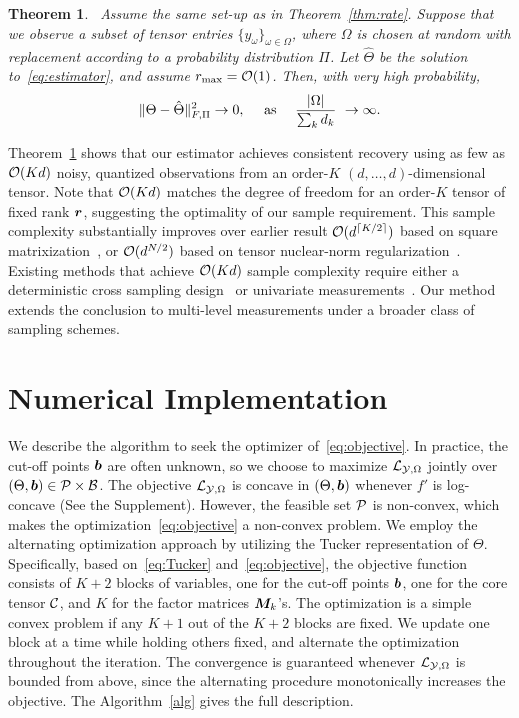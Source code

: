 \documentclass{article}
\theoremstyle{plain}
\newtheorem{thm}{Theorem}[section]
\theoremstyle{definition}
\begin{document}
\begin{thm}~\label{thm:completion}
Assume the same set-up as in Theorem~\ref{thm:rate}. Suppose that we observe a subset of tensor entries $\{y_\omega\}_{\omega\in\Omega}$, where $\Omega$ is chosen at random with replacement according to a probability distribution $\Pi$. Let $\hat \Theta$ be the solution to~\eqref{eq:estimator}, and assume $r_{\max}=\mathcal{O}(1)$. Then, with very high probability, 
\[
\lVert\Theta-\hat \Theta\rVert_{F,\Pi}^2 \to 0,\quad \text{ as }\quad {|\Omega|\over \sum_k d_k} \ \to \infty. 
\]
\end{thm}
Theorem~\ref{thm:completion} shows that our estimator achieves consistent recovery using as few as $\mathcal{O}(Kd)$ noisy, quantized observations from an order-$K$ $(d,\ldots,d)$-dimensional tensor. Note that $\mathcal{O}(Kd)$ matches the degree of freedom for an order-$K$ tensor of fixed rank $\bm{r}$, suggesting the optimality of our sample requirement. This sample complexity substantially improves over earlier result $\mathcal{O}(d^{\lceil K/2\rceil})$ based on square matrixization~\cite{mu2014square}, or $\mathcal{O}(d^{N/2})$ based on tensor nuclear-norm regularization~\cite{yuan2016tensor}. Existing methods that achieve $\mathcal{O}(Kd)$ sample complexity require either a deterministic cross sampling design~\cite{zhang2019cross} or univariate measurements~\cite{ghadermarzy2018learning}. Our method extends the conclusion to multi-level measurements under a broader class of sampling schemes. 

\section{Numerical Implementation}\label{sec:algorithm}
We describe the algorithm to seek the optimizer of~\eqref{eq:objective}. In practice, the cut-off points $\bm{b}$ are often unknown, so we choose to maximize $\mathcal{L}_{\mathcal{Y},\Omega}$ jointly over $(\Theta,\bm{b})\in\mathcal{P}\times \mathcal{B}$. The objective $\mathcal{L}_{\mathcal{Y},\Omega}$ is concave in $(\Theta,\bm{b})$ whenever $f'$ is log-concave (See the Supplement). However, the feasible set $\mathcal{P}$ is non-convex, which makes the optimization~\eqref{eq:objective} a non-convex problem. We employ the alternating optimization approach by utilizing the Tucker representation of $\Theta$. Specifically, based on~\eqref{eq:Tucker} and~\eqref{eq:objective}, the objective function consists of $K+2$ blocks of variables, one for the cut-off points $\bm{b}$, one for the core tensor $\mathcal{C}$, and $K$ for the factor matrices $\bm M_k$'s. The optimization is a simple convex problem if any $K+1$ out of the $K+2$ blocks are fixed. We update one block at a time while holding others fixed, and alternate the optimization throughout the iteration. The convergence is guaranteed whenever $\mathcal{L}_{\mathcal{Y},\Omega}$ is bounded from above, since the alternating procedure monotonically increases the objective. The Algorithm~\ref{alg} gives the full description.
\end{document}
